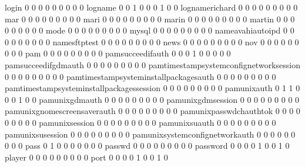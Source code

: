 \documentclass[compress,8pt]{beamer}
\begin{document}
\begin{frame}
\begin{Schunk}
  login                                      0   0   0   0   0   0   0   0   0
  logname                                    0   0   1   0   0   0   1   0   0
  lognamerichard                             0   0   0   0   0   0   0   0   0
  mar                                        0   0   0   0   0   0   0   0   0
  mari                                       0   0   0   0   0   0   0   0   0
  marin                                      0   0   0   0   0   0   0   0   0
  martin                                     0   0   0   0   0   0   0   0   0
  mode                                       0   0   0   0   0   0   0   0   0
  mysql                                      0   0   0   0   0   0   0   0   0
  nameavahiautoipd                           0   0   0   0   0   0   0   0   0
  namesftptest                               0   0   0   0   0   0   0   0   0
  news                                       0   0   0   0   0   0   0   0   0
  nov                                        0   0   0   0   0   0   0   0   0
  pam                                        0   0   0   0   0   0   0   0   0
  pamsucceedifauth                           0   0   0   1   0   0   0   0   0
  pamsucceedifgdmauth                        0   0   0   0   0   0   0   0   0
  pamtimestampsystemconfignetworksession     0   0   0   0   0   0   0   0   0
  pamtimestampsysteminstallpackagesauth      0   0   0   0   0   0   0   0   0
  pamtimestampsysteminstallpackagessession   0   0   0   0   0   0   0   0   0
  pamunixauth                                0   1   1   0   0   0   1   0   0
  pamunixgdmauth                             0   0   0   0   0   0   0   0   0
  pamunixgdmsession                          0   0   0   0   0   0   0   0   0
  pamunixgnomescreensaverauth                0   0   0   0   0   0   0   0   0
  pamunixpasswdchauthtok                     0   0   0   0   0   0   0   0   0
  pamunixsession                             0   0   0   0   0   0   0   0   0
  pamunixsuauth                              0   0   0   0   0   0   0   0   0
  pamunixsusession                           0   0   0   0   0   0   0   0   0
  pamunixsystemconfignetworkauth             0   0   0   0   0   0   0   0   0
  pass                                       0   1   0   0   0   0   0   0   0
  passwd                                     0   0   0   0   0   0   0   0   0
  password                                   0   0   0   0   1   0   0   1   0
  player                                     0   0   0   0   0   0   0   0   0
  port                                       0   0   0   0   1   0   0   1   0

\end{Schunk}
\end{frame}
\end{document}
